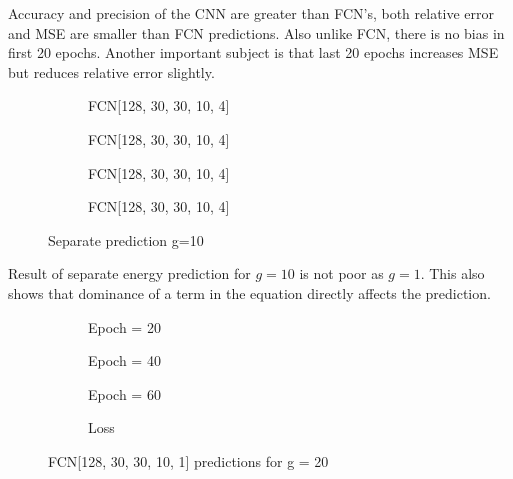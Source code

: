\documentclass[a4paper,times,12pt]{article}
\begin{document}
Accuracy and precision of the CNN are greater than FCN's, both relative error and MSE are smaller than FCN predictions. Also unlike FCN, there is no bias in first 20 epochs. Another important subject is that last 20 epochs increases MSE but reduces relative error slightly. 

\begin{figure}[H]
    \centering
    \begin{subfigure}[t]{0.45\textwidth}
		\centering
        
        \caption{FCN[128, 30, 30, 10, 4]}
		\label{fig:a}
    \end{subfigure}
    \begin{subfigure}[t]{0.45\textwidth}
		\centering
        
        \caption{FCN[128, 30, 30, 10, 4]}
		\label{fig:b}
    \end{subfigure}    
    \begin{subfigure}[t]{0.45\textwidth}
        \centering
        
        \caption{FCN[128, 30, 30, 10, 4]}
		\label{fig:c}
    \end{subfigure}
    \begin{subfigure}[t]{0.45\textwidth}
        \centering
        
        \caption{FCN[128, 30, 30, 10, 4]}
		\label{fig:c}
    \end{subfigure}
	\caption{Separate prediction  g=10}
\label{fig:FFN-g-10-S}
\end{figure}

Result of separate energy prediction for $g=10$ is not poor as $g = 1$. This also shows that dominance of a term in the equation directly affects the prediction. 

\begin{figure}[H]
    \centering
    \begin{subfigure}[t]{0.45\textwidth}
		\centering
        
        \caption{Epoch = 20}
		\label{fig:a}
    \end{subfigure}
    \begin{subfigure}[t]{0.45\textwidth}
		\centering
        
        \caption{Epoch = 40}
		\label{fig:b}
    \end{subfigure}    
    \begin{subfigure}[t]{0.45\textwidth}
        \centering
        
        \caption{Epoch = 60}
		\label{fig:c}
    \end{subfigure}
    \begin{subfigure}[t]{0.45\textwidth}
        \centering
        
        \caption{Loss}
		\label{fig:c}
    \end{subfigure}
	\caption{FCN[128, 30, 30, 10, 1] predictions for g = 20}
\label{fig:FFN-g-20}
\end{figure}
\end{document}
